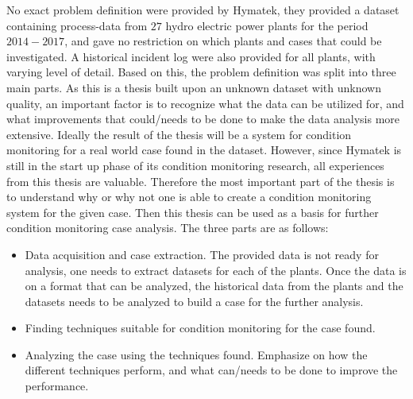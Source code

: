 
No exact problem definition were provided by Hymatek, they provided a dataset containing process-data from $27$ hydro electric power plants for the period $2014-2017$, and gave no restriction on which plants and cases that could be investigated. A historical incident log were also provided for all plants, with varying level of detail. Based on this, the problem definition was split into three main parts. As this is a thesis built upon an unknown dataset with unknown quality, an important factor is to recognize what the data can be utilized for, and what improvements that could/needs to be done to make the data analysis more extensive. Ideally the result of the thesis will be a system for condition monitoring for a real world case found in the dataset. However, since Hymatek is still in the start up phase of its condition monitoring research, all experiences from this thesis are valuable. Therefore the most important part of the thesis is to understand why or why not one is able to create a condition monitoring system for the given case. Then this thesis can be used as a basis for further condition monitoring case analysis. The three parts are as follows: 

\begin{itemize}
    \item Data acquisition and case extraction. The provided data is not ready for analysis, one needs to extract datasets for each of the plants. Once the data is on a format that can be analyzed, the historical data from the plants and the datasets needs to be analyzed to build a  case for the further analysis. 
    \item Finding techniques suitable for condition monitoring for the case found.  
    \item Analyzing the case using the techniques found. Emphasize on how the different techniques perform, and what can/needs to be done to improve the performance. 
\end{itemize}


    


